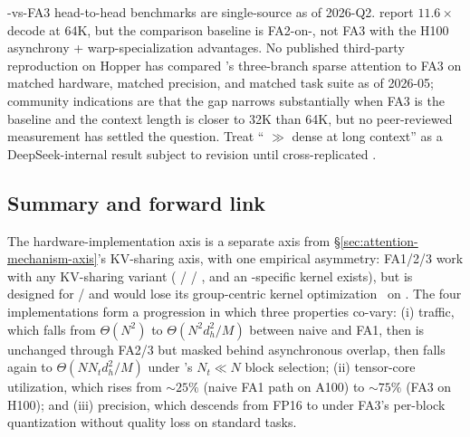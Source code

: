 \begin{contradiction}
-vs-FA3 head-to-head benchmarks are single-source as of 2026-Q2.
\citet{yuan2025} report $11.6\times$ decode at 64K, but the comparison
baseline is FA2-on-, not FA3 with the H100 asynchrony +
warp-specialization advantages. No published third-party reproduction
on Hopper has compared 's three-branch sparse attention to FA3 on
matched hardware, matched precision, and matched task suite as of
2026-05; community indications are that the gap narrows substantially
when FA3 is the baseline and the context length is closer to 32K than
64K, but no peer-reviewed measurement has settled the question.
Treat `` $\gg$ dense  at long context'' as a
DeepSeek-internal result subject to revision until cross-replicated
\citep{yuan2025}.
\end{contradiction}

\subsection{Summary and forward link}
\label{sec:hardware-summary}

The hardware-implementation axis is a separate axis from
\S\ref{sec:attention-mechanism-axis}'s KV-sharing axis, with one
empirical asymmetry: FA1/2/3 work with any KV-sharing variant ( /
 / , and an -specific kernel exists), but  is designed for
/ and would lose its group-centric kernel
optimization~\citep[\S 3.4]{yuan2025} on . The four implementations
form a progression in which three properties co-vary: (i)  traffic,
which falls from $\Theta(N^2)$ to $\Theta(N^2 d_h^2 / M)$ between
naive and FA1, then is unchanged through FA2/3 but masked behind
asynchronous overlap, then falls again to $\Theta(N N_t d_h^2 / M)$
under 's $N_t \ll N$ block selection; (ii) tensor-core utilization,
which rises from $\sim\!25\%$ (naive FA1 path on A100) to $\sim\!75\%$
(FA3 on H100); and (iii) precision, which descends from FP16 to 
under FA3's per-block quantization without quality loss on standard
tasks.

